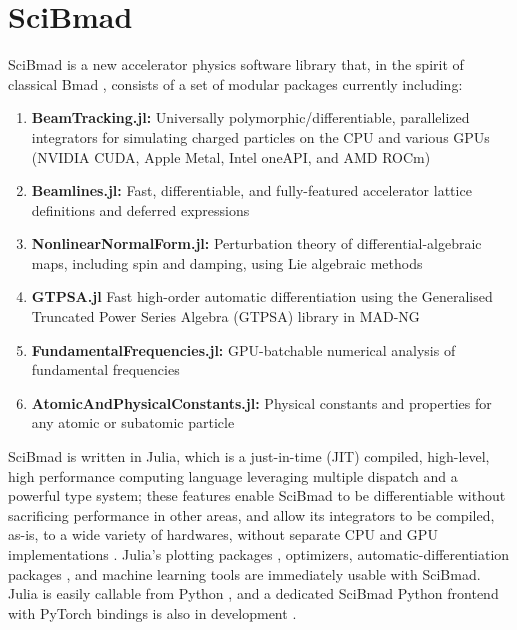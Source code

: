 \documentclass[a4paper,
               biblatex,     %
               ]{jacow}
\begin{document}
\section{SciBmad}
SciBmad is a new accelerator physics software library that, in the spirit of classical Bmad \cite{SAGAN2006356}, consists of a set of modular packages currently including:

\begin{enumerate}
	\item \textbf{BeamTracking.jl:} Universally polymorphic/differentiable, parallelized integrators for simulating charged particles on the CPU and various GPUs (NVIDIA CUDA, Apple Metal, Intel oneAPI, and AMD ROCm)
	\item \textbf{Beamlines.jl:} Fast, differentiable, and fully-featured accelerator lattice definitions and deferred expressions
	\item \textbf{NonlinearNormalForm.jl:} Perturbation theory of differential-algebraic maps, including spin and damping, using Lie algebraic methods \cite{forest1998beam,forest2016from}
	\item \textbf{GTPSA.jl} Fast high-order automatic differentiation using the Generalised Truncated Power Series Algebra (GTPSA) library in MAD-NG \cite{signorelli:napac2025-mop044,Deniau:2015yyo,deniau2025madngstandalonemultiplatformtool}
	\item \textbf{FundamentalFrequencies.jl:} GPU-batchable numerical analysis of fundamental frequencies \cite{LASKAR1990266}
	\item \textbf{AtomicAndPhysicalConstants.jl:} Physical constants and properties for any atomic or subatomic particle
\end{enumerate}

SciBmad is written in Julia, which is a just-in-time (JIT) compiled, high-level, high performance computing language leveraging multiple dispatch and a powerful type system; these features enable SciBmad to be differentiable without sacrificing performance in other areas, and allow its integrators to be compiled, as-is, to a wide variety of hardwares, without separate CPU and GPU implementations \cite{Churavy_KernelAbstractions_jl}. Julia's plotting packages \cite{DanischKrumbiegel2021}, optimizers, automatic-differentiation packages \cite{schäfer2022abstractdifferentiationjlbackendagnosticdifferentiableprogramming,dalle2025commoninterfaceautomaticdifferentiation}, and machine learning tools \cite{rackauckas2020universal} are immediately usable with SciBmad. Julia is easily callable from Python \cite{PythonCall.jl}, and a dedicated SciBmad Python frontend with PyTorch bindings is also in development \cite{chanpisey}.
\end{document}

